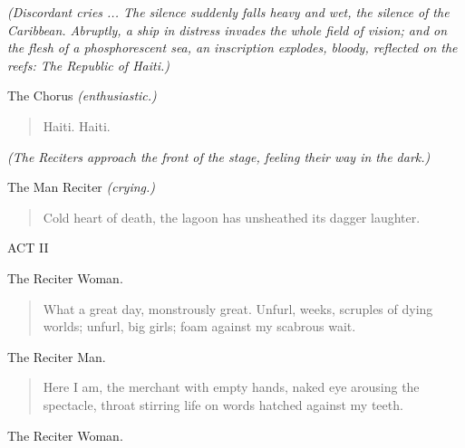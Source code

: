 \documentclass[letterpaper,article,12pt,oneside,notitlepage]{memoir}
\begin{document}
\textit{(Discordant cries ... The silence suddenly falls heavy and wet, the silence of the Caribbean. Abruptly, a ship in distress invades the whole field of vision; and on the flesh of a phosphorescent sea, an inscription explodes, bloody, reflected on the reefs: The Republic of Haiti.)}

\begin{center}The Chorus \textit{(enthusiastic.)}\end{center}

\begin{verse}
\hspace{1cm} Haiti. Haiti. \\
\end{verse}

\textit{(The Reciters approach the front of the stage, feeling their way in the dark.)}

\begin{center}The Man Reciter \textit{(crying.)}\end{center}

\begin{verse}
Cold heart of death, the lagoon has unsheathed its dagger laughter. \\
\end{verse}

\clearpage

\begin{center}ACT II\end{center}
\vspace{1cm}

\begin{center}The Reciter Woman.\end{center}

\begin{verse}
What a great day, monstrously great. Unfurl, weeks, scruples of dying worlds; unfurl, big girls; foam against my scabrous wait. \\
\end{verse}

\begin{center}The Reciter Man.\end{center}

\begin{verse}
Here I am, the merchant with empty hands, naked eye arousing the spectacle, throat stirring life on words hatched against my teeth. \\
\end{verse}

\begin{center}The Reciter Woman.\end{center}
\end{document}
